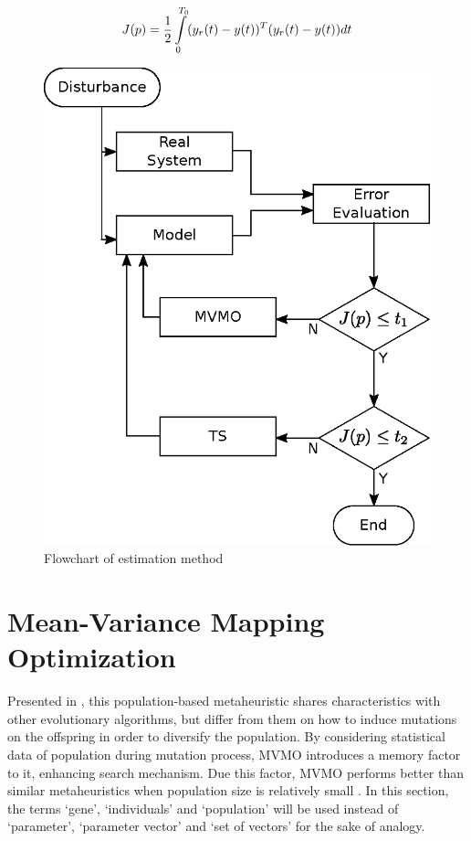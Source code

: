 \begin{equation}
	J(p) = \frac{1}{2}\int\displaylimits_{0}^{T_{0}}(y_{r}(t) - y(t))^{T}(y_{r}(t) - y(t))dt
	\label{eq: J(p)}
\end{equation}

\begin{figure}
	\caption{Flowchart of estimation method}
	\begin{center}
		\includegraphics[scale=0.7]{Images/Flowchart.eps}
	\end{center}
	\label{fig: flowchart}
\end{figure}

\section{Mean-Variance Mapping Optimization}

Presented in \cite{Erlich2010}, this population-based metaheuristic shares characteristics with other evolutionary algorithms, but differ from them on how to induce mutations on the offspring in order to diversify the population. By considering statistical data of population during mutation process, MVMO introduces a memory factor to it, enhancing search mechanism. Due this factor, MVMO performs better than similar metaheuristics when population size is relatively small \cite{Nakawiro2011}. In this section, the terms `gene', `individuals' and `population' will be used instead of `parameter', `parameter vector' and `set of vectors' for the sake of analogy.

